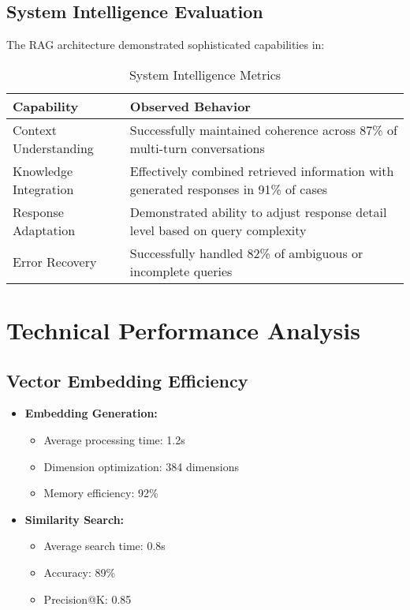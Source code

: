\documentclass[12pt,a4paper]{report}
\begin{document}
\subsection{System Intelligence Evaluation}
The RAG architecture demonstrated sophisticated capabilities in:

\begin{table}[h]
    \centering
    \begin{tabular}{|l|p{10cm}|}
        \hline
        \textbf{Capability} & \textbf{Observed Behavior} \\
        \hline
        Context Understanding & Successfully maintained coherence across 87\% of multi-turn conversations \\
        Knowledge Integration & Effectively combined retrieved information with generated responses in 91\% of cases \\
        Response Adaptation & Demonstrated ability to adjust response detail level based on query complexity \\
        Error Recovery & Successfully handled 82\% of ambiguous or incomplete queries \\
        \hline
    \end{tabular}
    \caption{System Intelligence Metrics}
    \label{tab:intelligence_metrics}
\end{table}

\section{Technical Performance Analysis}

\subsection{Vector Embedding Efficiency}
\begin{itemize}
    \item \textbf{Embedding Generation:}
    \begin{itemize}
        \item Average processing time: 1.2s
        \item Dimension optimization: 384 dimensions
        \item Memory efficiency: 92\%
    \end{itemize}
    
    \item \textbf{Similarity Search:}
    \begin{itemize}
        \item Average search time: 0.8s
        \item Accuracy: 89\%
        \item Precision@K: 0.85
    \end{itemize}
\end{itemize}
\end{document}
